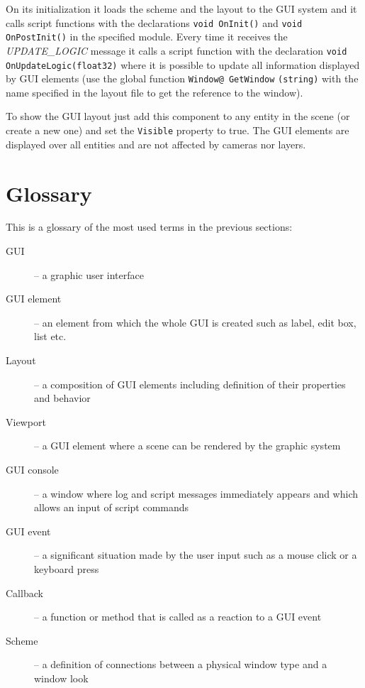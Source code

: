On its initialization it loads the scheme and the layout to the GUI system and it calls script functions with the declarations \verb/void OnInit()/ and \verb/void OnPostInit()/ in the specified module. Every time it receives the \emph{UPDATE\_LOGIC} message it calls a script function with the declaration \verb/void OnUpdateLogic(float32)/ where it is possible to update all information displayed by GUI elements (use the global function \verb/Window@ GetWindow/ \verb/(string)/ with the name specified in the layout file to get the reference to the window).

To show the GUI layout just add this component to any entity in the scene (or create a new one) and set the \verb/Visible/ property to true. The GUI elements are displayed over all entities and are not affected by cameras nor layers.

\section{Glossary}
This is a glossary of the most used terms in the previous sections:

\begin{description}
  \item[GUI] -- a graphic user interface
  \item[GUI element] -- an element from which the whole GUI is created such as label, edit box, list etc.
  \item[Layout] -- a composition of GUI elements including definition of their properties and behavior
  \item[Viewport] -- a GUI element where a scene can be rendered by the graphic system
  \item[GUI console] -- a window where log and script messages immediately appears and which allows an input of script commands
  \item[GUI event] -- a significant situation made by the user input such as a mouse click or a keyboard press
  \item[Callback] -- a function or method that is called as a reaction to a GUI event
  \item[Scheme] -- a definition of connections between a physical window type and a window look
\end{description}